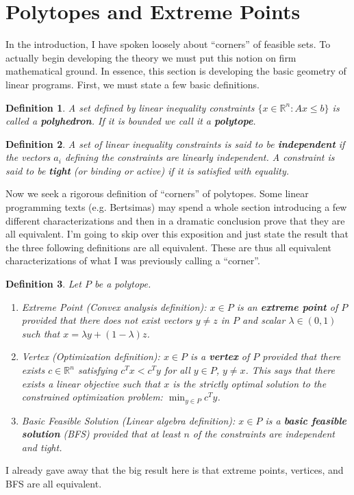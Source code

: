 \documentclass[12pt]{article}
\newcommand{\R}{\mathcal{R}}
\def\R{\mathbb{R}}
\newtheorem{definition}{Definition}
\begin{document}
\section{Polytopes and Extreme Points}
In the introduction, I have spoken loosely about ``corners'' of feasible sets. To actually begin developing the theory we must put this notion on firm mathematical ground. In essence, 
this section is developing the basic geometry of linear programs. First, we must state a few basic definitions. 
\begin{definition}
A set defined by linear inequality constraints $\{x \in \R^n: Ax \leq b\}$ is called a \textbf{polyhedron}. If it is bounded we call it a \textbf{polytope}. 
\end{definition}

\begin{definition}
A set of linear inequality constraints is said to be \textbf{independent} if the vectors $a_i$ defining the constraints are linearly independent. A constraint is said to be 
\textbf{tight} (or binding or active) if it is satisfied with equality.  
\end{definition}

Now we seek a rigorous definition of ``corners'' of polytopes. Some linear programming texts (e.g. Bertsimas) may spend a whole section introducing a few different characterizations
and then in a dramatic conclusion prove that they are all equivalent. I'm going to skip over this exposition and just state  the result that the three following definitions are all equivalent. 
These are thus all equivalent characterizations of what I was previously calling a ``corner''. 
\begin{definition}
Let $P$ be a polytope. 
\begin{enumerate} 
\item Extreme Point (Convex analysis definition): $x \in P$ is an \textbf{extreme point} of $P$ provided that there does not exist vectors $y \neq z$ in $P$ and scalar $\lambda \in (0, 1)$
such that $x = \lambda y + (1 - \lambda)z$. 
\item Vertex (Optimization definition): $x \in P$ is a \textbf{vertex} of $P$ provided that there exists $c \in \R^n$ satisfying $c^T x < c^T y$ for all $y \in P$, $y \neq x$. This says that there
exists a linear objective such that $x$ is the strictly optimal solution to the constrained optimization problem: $\min_{y \in P} c^T y$. 
\item Basic Feasible Solution (Linear algebra definition): $x \in P$ is a \textbf{basic feasible solution} (BFS) provided that at least $n$ of the constraints are independent and tight. 
\end{enumerate}
\end{definition}
I already gave away that the big result here is that extreme points, vertices, and BFS are all equivalent.

	
\end{document}
